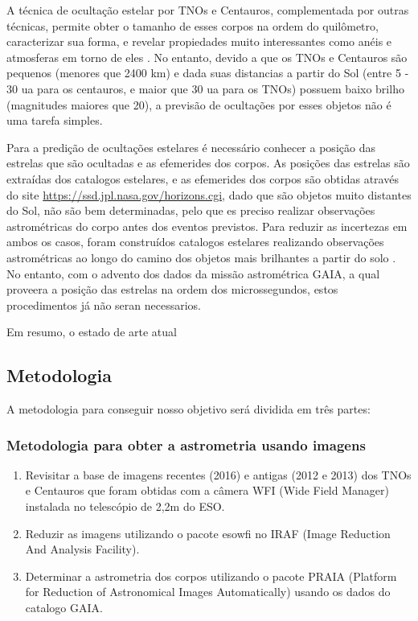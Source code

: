 \documentclass[a4paper, 11pt]{article}
\begin{document}
A técnica de ocultação estelar por TNOs e Centauros, complementada por outras técnicas, permite obter o tamanho de esses corpos na ordem do quilômetro, caracterizar sua forma, e revelar propiedades muito interessantes como anéis \citep{2017Natur.550..219O, 2014AGUFM.P43F..01B} e atmosferas em torno de eles \citep{1538-3881-136-5-1757, 2006Natur.439...52S}. No entanto, devido a que os TNOs e Centauros são pequenos (menores que 2400 km) e dada suas distancias a partir do Sol (entre  5 - 30 ua para os centauros, e maior que 30 ua para os TNOs) possuem baixo brilho (magnitudes maiores que 20), a previsão de ocultações por esses objetos não é uma tarefa simples. 

Para a predição de ocultações estelares é necessário conhecer a posição das estrelas que são ocultadas e as efemerides dos corpos. As posições das estrelas são extraídas dos catalogos estelares, e as efemerides dos corpos são obtidas através do site \url{https://ssd.jpl.nasa.gov/horizons.cgi}, dado que são objetos muito distantes do Sol, não são bem determinadas, pelo que es preciso realizar observações astrométricas do corpo antes dos eventos previstos.
Para reduzir as incertezas em ambos os casos, foram construídos catalogos estelares realizando observações astrométricas ao longo do camino dos objetos mais brilhantes a partir do solo \citep{2010A&A...515A..32A,2014A&A...561A..37C}. No entanto, com o advento dos dados da missão astrométrica GAIA, a qual proveera a posição das estrelas na ordem dos microssegundos, estos procedimentos já não seran necessarios. 

Em resumo, o estado de arte atual
\subsection{Metodologia}

A metodologia para conseguir nosso objetivo será dividida em três partes:

\subsubsection{Metodologia para obter a astrometria usando imagens}
\begin{enumerate}
  \item Revisitar a base de imagens recentes (2016) e antigas (2012 e 2013) dos TNOs e Centauros que foram obtidas com a câmera WFI (Wide Field Manager) instalada no telescópio de 2,2m do ESO.
  \item Reduzir as imagens utilizando o pacote esowfi no IRAF (Image Reduction And Analysis Facility). 
  \item Determinar a astrometria dos corpos utilizando o pacote PRAIA (Platform for Reduction of Astronomical Images Automatically) usando os dados do catalogo GAIA.
\end{enumerate}
\end{document}
